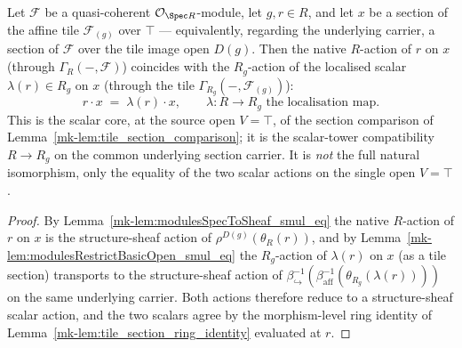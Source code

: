 \begin{lemma}\label{mk-lem:tile_scalar_compat}
  \leanok

  Let \(\mathcal{F}\) be a quasi-coherent \(\mathcal{O}_{\Spec R}\)-module, let \(g, r \in R\), and let
  \(x\) be a section of the affine tile \(\mathcal{F}_{(g)}\) over \(\top\) --- equivalently, regarding
  the underlying carrier, a section of \(\mathcal{F}\) over the tile image open \(D(g)\). Then the native
  \(R\)-action of \(r\) on \(x\) (through \(\Gamma_R(-,\mathcal{F})\)) coincides with the \(R_g\)-action
  of the localised scalar \(\lambda(r) \in R_g\) on \(x\) (through the tile
  \(\Gamma_{R_g}(-, \mathcal{F}_{(g)})\)):
  \[
    r \cdot x \;=\; \lambda(r) \cdot x,
    \qquad \lambda : R \to R_g \text{ the localisation map}.
  \]
  This is the scalar core, at the source open \(V = \top\), of the section comparison of
  Lemma~\ref{mk-lem:tile_section_comparison}; it is the scalar-tower compatibility \(R \to R_g\) on the
  common underlying section carrier. It is \emph{not} the full natural isomorphism, only the equality of
  the two scalar actions on the single open \(V = \top\).
\end{lemma}
\begin{proof}
  \leanok
    By Lemma~\ref{mk-lem:modulesSpecToSheaf_smul_eq} the native \(R\)-action of \(r\) on \(x\) is the
  structure-sheaf action of \(\rho^{D(g)}(\theta_R(r))\), and by
  Lemma~\ref{mk-lem:modulesRestrictBasicOpen_smul_eq} the \(R_g\)-action of \(\lambda(r)\) on \(x\) (as a
  tile section) transports to the structure-sheaf action of
  \(\beta_{\hookrightarrow}^{-1}(\beta_{\mathrm{aff}}^{-1}(\theta_{R_g}(\lambda(r))))\) on the same
  underlying carrier. Both actions therefore reduce to a structure-sheaf scalar action, and the two
  scalars agree by the morphism-level ring identity of Lemma~\ref{mk-lem:tile_section_ring_identity}
  evaluated at \(r\).
\end{proof}

